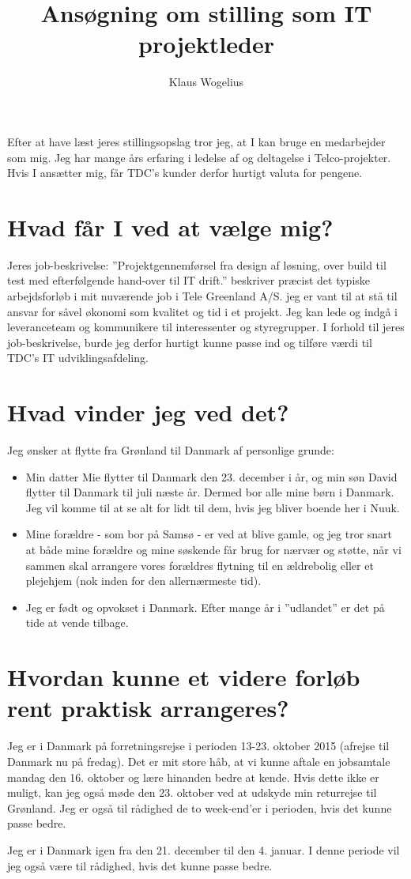 \documentclass[11pt,a4paper,twoside]{article}
\author{Klaus Wogelius}
\title{Ansøgning om stilling som IT projektleder}
\begin{document}
\maketitle

Efter at have læst jeres stillingsopslag tror jeg, at I kan bruge en medarbejder som mig. Jeg har mange års erfaring i ledelse af og deltagelse i Telco-projekter\cite{CV}. Hvis I ansætter mig, får TDC's kunder derfor hurtigt valuta for pengene.
\section*{Hvad får I ved at vælge mig?}
Jeres job-beskrivelse: ''Projektgennemførsel fra design af løsning, over build til test med efterfølgende hand-over til IT drift.'' beskriver præcist det typiske arbejdsforløb i mit nuværende job i Tele Greenland A/S. jeg er vant til at stå til ansvar for såvel økonomi som kvalitet og tid i et projekt. Jeg kan lede og indgå i leveranceteam og kommunikere til interessenter og styregrupper. I forhold til jeres job-beskrivelse, burde jeg derfor hurtigt kunne passe ind og tilføre værdi til TDC's IT udviklingsafdeling.
\section*{Hvad vinder jeg ved det?}
Jeg ønsker at flytte fra Grønland til Danmark af personlige grunde:
\begin{itemize}
\item Min datter Mie flytter til Danmark den 23. december i år, og min søn David flytter til Danmark til juli næste år. Dermed bor alle mine børn i Danmark. Jeg vil komme til at se alt for lidt til dem, hvis jeg bliver boende her i Nuuk.
\item Mine forældre - som bor på Samsø - er ved at blive gamle, og jeg tror snart at både mine forældre og mine søskende får brug for nærvær og støtte, når vi sammen skal arrangere vores forældres flytning til en ældrebolig eller et plejehjem (nok inden for den allernærmeste tid).
\item Jeg er født og opvokset i Danmark. Efter mange år i ''udlandet'' er det på tide at vende tilbage.
\end{itemize}
\section*{Hvordan kunne et videre forløb rent praktisk arrangeres?}
Jeg er i Danmark på forretningsrejse i perioden 13-23. oktober 2015 (afrejse til Danmark nu på fredag). Det er mit store håb, at vi kunne aftale en jobsamtale mandag den 16. oktober og lære hinanden bedre at kende. Hvis dette ikke er muligt, kan jeg også møde den 23. oktober ved at udskyde min returrejse til Grønland. Jeg er også til rådighed de to week-end'er i perioden, hvis det kunne passe bedre.
\par
Jeg er i Danmark igen fra den 21. december til den 4. januar. I denne periode vil jeg også være til rådighed, hvis det kunne passe bedre.
\end{document}
